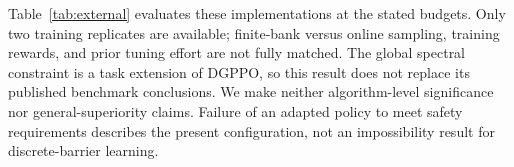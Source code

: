 


Table~\ref{tab:external} evaluates these implementations at the stated budgets. Only two training replicates are available; finite-bank versus online sampling, training rewards, and prior tuning effort are not fully matched. The global spectral constraint is a task extension of DGPPO, so this result does not replace its published benchmark conclusions. We make neither algorithm-level significance nor general-superiority claims. Failure of an adapted policy to meet safety requirements describes the present configuration, not an impossibility result for discrete-barrier learning.
